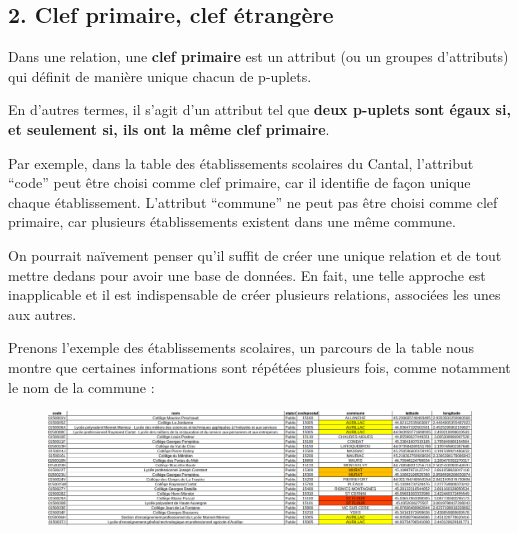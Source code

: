 \documentclass[
  letterpaper,
  DIV=11,
  numbers=noendperiod]{scrartcl}
\begin{document}
\hypertarget{clef-primaire-clef-uxe9tranguxe8re}{%
\subsection{2. Clef primaire, clef
étrangère}\label{clef-primaire-clef-uxe9tranguxe8re}}

\begin{tcolorbox}[enhanced jigsaw, colbacktitle=quarto-callout-tip-color!10!white, opacitybacktitle=0.6, left=2mm, coltitle=black, bottomtitle=1mm, arc=.35mm, opacityback=0, title=\textcolor{quarto-callout-tip-color}{\faLightbulb}\hspace{0.5em}{Définition}, breakable, toprule=.15mm, rightrule=.15mm, bottomrule=.15mm, colback=white, colframe=quarto-callout-tip-color-frame, toptitle=1mm, titlerule=0mm, leftrule=.75mm]

Dans une relation, une \textbf{clef primaire} est un attribut (ou un
groupes d'attributs) qui définit de manière unique chacun de p-uplets.

\end{tcolorbox}

En d'autres termes, il s'agit d'un attribut tel que \textbf{deux
p-uplets sont égaux si, et seulement si, ils ont la même clef primaire}.

Par exemple, dans la table des établissements scolaires du Cantal,
l'attribut ``code'' peut être choisi comme clef primaire, car il
identifie de façon unique chaque établissement. L'attribut ``commune''
ne peut pas être choisi comme clef primaire, car plusieurs
établissements existent dans une même commune.

On pourrait naïvement penser qu'il suffit de créer une unique relation
et de tout mettre dedans pour avoir une base de données. En fait, une
telle approche est inapplicable et il est indispensable de créer
plusieurs relations, associées les unes aux autres.

Prenons l'exemple des établissements scolaires, un parcours de la table
nous montre que certaines informations sont répétées plusieurs fois,
comme notamment le nom de la commune :

\begin{figure}

{\centering \includegraphics{BDD6.png}

}

\end{figure}
\end{document}

